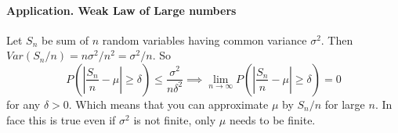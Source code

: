 \documentclass{article}
\begin{document}
	\paragraph{Application. Weak Law of Large numbers} Let $S_n$ be sum of $n$ random variables having common variance $\sigma^2$. 
	Then $Var (S_n/n) = n\sigma^2 / n^2 = \sigma^2 /n$. So \[P(|\frac{S_n}{n} - \mu| \geq \delta) \leq \frac{\sigma^2}{n\delta^2}  \implies \lim_{n\to\infty} P(|\frac{S_n}{n} - \mu| \geq \delta) = 0\] for any $\delta > 0$. Which	means that you can approximate $\mu$ by $S_n /n$ for large $n$. In face this is true even if $\sigma^2$ is not finite, only $\mu$ needs to be finite.
	
\end{document}
